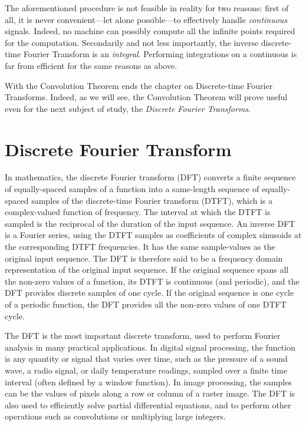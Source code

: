 \documentclass[\documentfontsize, twocolumn]{\classname}
\begin{document}
The aforementioned procedure is not feasible in reality for two reasons: first of all, it is never convenient---let alone possible---to effectively handle \emph{continuous} signals. Indeed, no machine can possibly compute all the infinite points required for the computation. Secondarily and not less importantly, the inverse discrete-time Fourier Transform is an \emph{integral}. Performing integrations on a continuous is far from efficient for the same reasons as above.

With the Convolution Theorem ends the chapter on Discrete-time Fourier Transforms. Indeed, as we will see, the Convolution Theorem will prove useful even for the next subject of study, the \emph{Discrete Fourier Transforms}.


\chapter{Discrete Fourier Transform}

In mathematics, the discrete Fourier transform (DFT) converts a finite sequence of equally-spaced samples of a function into a same-length sequence of equally-spaced samples of the discrete-time Fourier transform (DTFT), which is a complex-valued function of frequency. The interval at which the DTFT is sampled is the reciprocal of the duration of the input sequence. An inverse DFT is a Fourier series, using the DTFT samples as coefficients of complex sinusoids at the corresponding DTFT frequencies. It has the same sample-values as the original input sequence. The DFT is therefore said to be a frequency domain representation of the original input sequence. If the original sequence spans all the non-zero values of a function, its DTFT is continuous (and periodic), and the DFT provides discrete samples of one cycle. If the original sequence is one cycle of a periodic function, the DFT provides all the non-zero values of one DTFT cycle.

The DFT is the most important discrete transform, used to perform Fourier analysis in many practical applications. In digital signal processing, the function is any quantity or signal that varies over time, such as the pressure of a sound wave, a radio signal, or daily temperature readings, sampled over a finite time interval (often defined by a window function). In image processing, the samples can be the values of pixels along a row or column of a raster image. The DFT is also used to efficiently solve partial differential equations, and to perform other operations such as convolutions or multiplying large integers.
\end{document}
